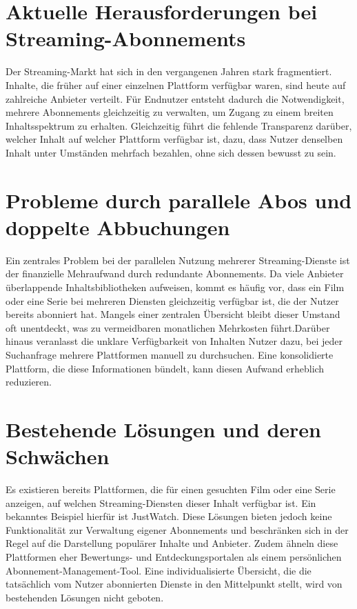 \section{Aktuelle Herausforderungen bei Streaming-Abonnements}
Der Streaming-Markt hat sich in den vergangenen Jahren stark fragmentiert. Inhalte, 
die früher auf einer einzelnen Plattform verfügbar waren, sind heute auf zahlreiche Anbieter 
verteilt. Für Endnutzer entsteht dadurch die Notwendigkeit, mehrere Abonnements gleichzeitig 
zu verwalten, um Zugang zu einem breiten Inhaltsspektrum zu erhalten. Gleichzeitig führt die 
fehlende Transparenz darüber, welcher Inhalt auf welcher Plattform verfügbar ist, dazu, 
dass Nutzer denselben Inhalt unter Umständen mehrfach bezahlen, ohne sich dessen bewusst zu sein.
\section{Probleme durch parallele Abos und doppelte Abbuchungen}
Ein zentrales Problem bei der parallelen Nutzung mehrerer Streaming-Dienste ist 
der finanzielle Mehraufwand durch redundante Abonnements. Da viele Anbieter überlappende 
Inhaltsbibliotheken aufweisen, kommt es häufig vor, dass ein Film oder eine Serie 
bei mehreren Diensten gleichzeitig verfügbar ist, die der Nutzer bereits abonniert hat. 
Mangels einer zentralen Übersicht bleibt dieser Umstand oft unentdeckt, was zu vermeidbaren 
monatlichen Mehrkosten führt.Darüber hinaus 
veranlasst die unklare Verfügbarkeit von Inhalten Nutzer dazu, bei jeder Suchanfrage mehrere Plattformen manuell zu durchsuchen. Eine konsolidierte Plattform, die diese Informationen bündelt, kann diesen Aufwand erheblich reduzieren.
\section{Bestehende Lösungen und deren Schwächen}
Es existieren bereits Plattformen, die für einen gesuchten Film oder eine Serie anzeigen, auf welchen Streaming-Diensten dieser Inhalt verfügbar ist. Ein bekanntes Beispiel hierfür ist JustWatch. Diese Lösungen bieten jedoch keine Funktionalität zur Verwaltung eigener Abonnements und beschränken sich in der Regel auf die Darstellung populärer Inhalte und Anbieter. Zudem ähneln diese Plattformen eher Bewertungs- und Entdeckungsportalen als einem persönlichen Abonnement-Management-Tool. Eine individualisierte Übersicht, die die tatsächlich vom Nutzer abonnierten Dienste in den Mittelpunkt stellt, wird von bestehenden Lösungen nicht geboten.
